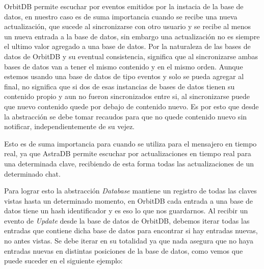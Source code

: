 OrbitDB permite escuchar por eventos emitidos por la instacia de la base de datos, en nuestro caso es de suma importancia cuando se recibe una nueva actualización, que sucede al sincronizarse con otro usuario y se recibe al menos un nueva entrada a la base de datos, sin embargo una actualización no es siempre el ultimo valor agregado a una base de datos. Por la naturaleza de las bases de datos de OrbitDB y su eventual consistencia, significa que al sincronizarse ambas bases de datos van a tener el mismo contenido y en el mismo orden. Aunque estemos usando una base de datos de tipo eventos y solo se pueda agregar al final, no significa que si dos de esas instancias de bases de datos tienen su contenido propio y aun no fueron sincronizados entre si, al sincronizarse puede que nuevo contenido quede por debajo de contenido nuevo. Es por esto que desde la abstracción se debe tomar recaudos para que no quede contenido nuevo sin notificar, independientemente de su vejez.

Esto es de suma importancia para cuando se utiliza para el mensajero en tiempo real, ya que AstraDB permite escuchar por actualizaciones en tiempo real para una determinada clave, recibiendo de esta forma todas las actualizaciones de un determinado chat.

Para lograr esto la abstracción \textit{Database} mantiene un registro de todas las claves vistas hasta un determinado momento, en OrbitDB cada entrada a una base de datos tiene un hash identificador y es eso lo que nos guardarnos. Al recibir un evento de \textit{Update} desde la base de datos de OrbitDB, debemos iterar todas las entradas que contiene dicha base de datos para encontrar si hay entradas nuevas, no antes vistas. Se debe iterar en su totalidad ya que nada asegura que no haya entradas nuevas en distintas posiciones de la base de datos, como vemos que puede suceder en el siguiente ejemplo:

